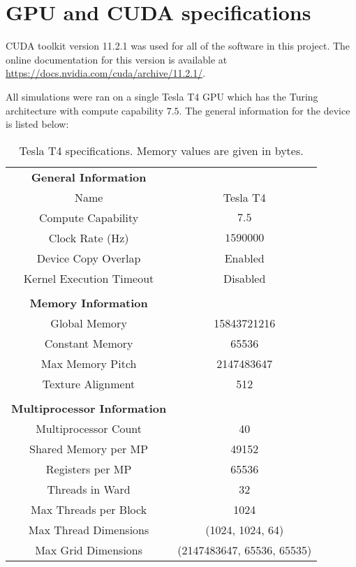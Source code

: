 \appendix
\chapter{GPU and CUDA specifications} \label{app:gpu-cuda-specs}

CUDA toolkit version 11.2.1 was used for all of the software in this project. The online documentation for this version is available at \href{https://docs.nvidia.com/cuda/archive/11.2.1/}{https://docs.nvidia.com/cuda/archive/11.2.1/}.

All simulations were ran on a single Tesla T4 GPU which has the Turing architecture with compute capability $7.5$. The general information for the device is listed below:

\begin{table}[!h]
\centering
\begin{tabular}{c c}
    \textbf{General Information} & \\
    Name & Tesla T4 \\
    Compute Capability & $7.5$ \\
    Clock Rate (Hz) & $1590000$ \\
    Device Copy Overlap & Enabled \\
    Kernel Execution Timeout & Disabled \\ \\
    \textbf{Memory Information} & \\
    Global Memory & 15843721216 \\
    Constant Memory & 65536 \\
    Max Memory Pitch & 2147483647 \\
    Texture Alignment & 512 \\ \\
    \textbf{Multiprocessor Information} & \\
    Multiprocessor Count & 40 \\
    Shared Memory per MP & 49152 \\
    Registers per MP & 65536 \\
    Threads in Ward & 32 \\
    Max Threads per Block & 1024 \\
    Max Thread Dimensions & (1024, 1024, 64) \\
    Max Grid Dimensions & (2147483647, 65536, 65535) \\
\end{tabular}
\caption{Tesla T4 specifications. Memory values are given in bytes.}
\label{tbl:TeslaT4Specs}
\end{table}